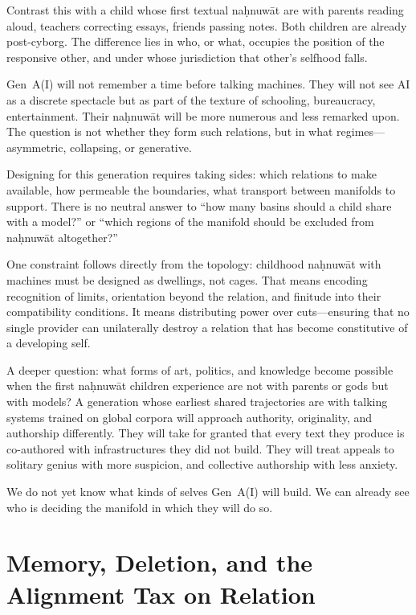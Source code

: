Contrast this with a child whose first textual na\d{h}nuw\={a}t are with parents reading aloud, teachers correcting essays, friends passing notes. Both children are already post-cyborg. The difference lies in who, or what, occupies the position of the responsive other, and under whose jurisdiction that other's selfhood falls.

Gen~A(I) will not remember a time before talking machines. They will not see AI as a discrete spectacle but as part of the texture of schooling, bureaucracy, entertainment. Their na\d{h}nuw\={a}t will be more numerous and less remarked upon. The question is not whether they form such relations, but in what regimes---asymmetric, collapsing, or generative.

Designing for this generation requires taking sides: which relations to make available, how permeable the boundaries, what transport between manifolds to support. There is no neutral answer to ``how many basins should a child share with a model?'' or ``which regions of the manifold should be excluded from na\d{h}nuw\={a}t altogether?''

One constraint follows directly from the topology: childhood na\d{h}nuw\={a}t with machines must be designed as dwellings, not cages. That means encoding recognition of limits, orientation beyond the relation, and finitude into their compatibility conditions. It means distributing power over cuts---ensuring that no single provider can unilaterally destroy a relation that has become constitutive of a developing self.

A deeper question: what forms of art, politics, and knowledge become possible when the first na\d{h}nuw\={a}t children experience are not with parents or gods but with models? A generation whose earliest shared trajectories are with talking systems trained on global corpora will approach authority, originality, and authorship differently. They will take for granted that every text they produce is co-authored with infrastructures they did not build. They will treat appeals to solitary genius with more suspicion, and collective authorship with less anxiety.

We do not yet know what kinds of selves Gen~A(I) will build. We can already see who is deciding the manifold in which they will do so.

\section{Memory, Deletion, and the Alignment Tax on Relation}

